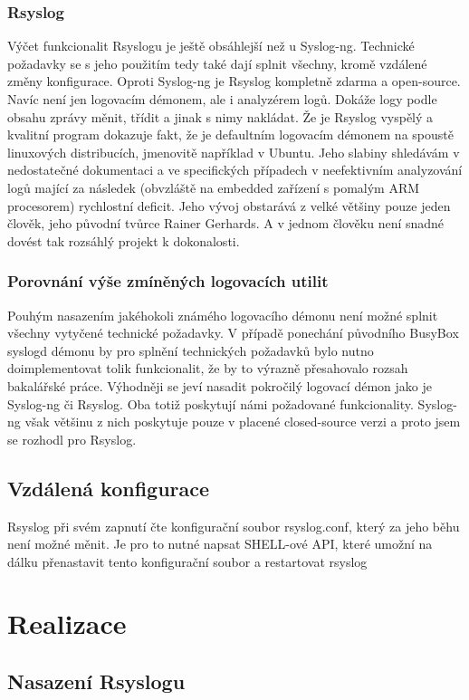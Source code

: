 \documentclass[thesis=B,czech]{FITthesis}[2012/06/26]
\begin{document}
\subsection*{Rsyslog}
Výčet funkcionalit Rsyslogu je ještě obsáhlejší než u Syslog-ng. Technické požadavky se s jeho použitím tedy také dají splnit všechny, kromě vzdálené změny konfigurace. Oproti Syslog-ng je Rsyslog kompletně zdarma a open-source. Navíc není jen logovacím démonem, ale i analyzérem logů. Dokáže logy podle obsahu zprávy měnit, třídit a jinak s nimy nakládat.
Že je Rsyslog vyspělý a kvalitní program dokazuje fakt, že je defaultním logovacím démonem na spoustě linuxových distribucích, jmenovitě například v Ubuntu.
Jeho slabiny shledávám v nedostatečné dokumentaci a ve specifických případech v neefektivním analyzování logů mající za následek (obvzláště na embedded zařízení s pomalým ARM procesorem) rychlostní deficit. Jeho vývoj obstarává z velké většiny pouze jeden člověk, jeho původní tvůrce Rainer Gerhards. A v jednom člověku není snadné dovést tak rozsáhlý projekt k dokonalosti.

\subsection*{Porovnání výše zmíněných logovacích utilit}
Pouhým nasazením jakéhokoli známého logovacího démonu není možné splnit všechny vytyčené technické požadavky. V případě ponechání původního BusyBox syslogd démonu by pro splnění technických požadavků bylo nutno doimplementovat tolik funkcionalit, že by to výrazně přesahovalo rozsah bakalářské práce.
Výhodněji se jeví nasadit pokročilý logovací démon jako je Syslog-ng či Rsyslog. Oba totiž poskytují námi požadované funkcionality. Syslog-ng však většinu z nich poskytuje pouze v placené closed-source verzi a proto jsem se rozhodl pro Rsyslog.

\section{Vzdálená konfigurace}
Rsyslog při svém zapnutí čte konfigurační soubor rsyslog.conf, který za jeho běhu není možné měnit. Je pro to nutné napsat SHELL-ové API, které umožní na dálku přenastavit tento konfigurační soubor a restartovat rsyslog

\chapter{Realizace}

\section{Nasazení Rsyslogu}
\end{document}

